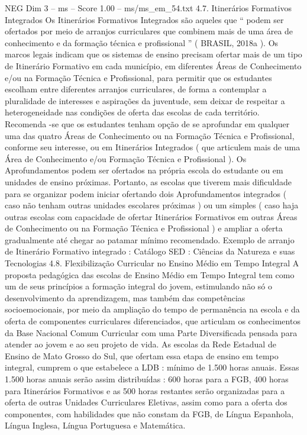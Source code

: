 \begin{textsample}{NEG Dim 3 – ms – Score 1.00 – ms/ms\_em\_54.txt}  \label{ex:f3_neg_093}
4.7.
Itinerários Formativos Integrados Os Itinerários Formativos Integrados são aqueles que “ podem ser ofertados por meio de arranjos curriculares que combinem mais de uma área de conhecimento e da formação técnica e profissional ” ( BRASIL, 2018a ).
Os marcos legais indicam que os sistemas de ensino precisam ofertar mais de um tipo de Itinerário Formativo em cada município, em diferentes Áreas de Conhecimento e/ou na Formação Técnica e Profissional, para permitir que os estudantes escolham entre diferentes arranjos curriculares, de forma a contemplar a pluralidade de interesses e aspirações da juventude, sem deixar de respeitar a heterogeneidade nas condições de oferta das escolas de cada território.
Recomenda -se que os estudantes tenham opção de se aprofundar em qualquer uma das quatro Áreas de Conhecimento ou na Formação Técnica e Profissional, conforme seu interesse, ou em Itinerários Integrados ( que articulem mais de uma Área de Conhecimento e/ou Formação Técnica e Profissional ).
Os Aprofundamentos podem ser ofertados na própria escola do estudante ou em unidades de ensino próximas.
Portanto, as escolas que tiverem mais dificuldade para se organizar podem iniciar ofertando dois Aprofundamentos integrados ( caso não tenham outras unidades escolares próximas ) ou um simples ( caso haja outras escolas com capacidade de ofertar Itinerários Formativos em outras Áreas de Conhecimento ou na Formação Técnica e Profissional ) e ampliar a oferta gradualmente até chegar ao patamar mínimo recomendado.
Exemplo de arranjo de Itinerário Formativo integrado : Catálogo SED : Ciências da Natureza e suas Tecnologias 4.8.
Flexibilização Curricular no Ensino Médio em Tempo Integral A proposta pedagógica das escolas de Ensino Médio em Tempo Integral tem como um de seus princípios a formação integral do jovem, estimulando não só o desenvolvimento da aprendizagem, mas também das competências socioemocionais, por meio da ampliação do tempo de permanência na escola e da oferta de componentes curriculares diferenciados, que articulam os conhecimentos da Base Nacional Comum Curricular com uma Parte Diversificada pensada para atender ao jovem e ao seu projeto de vida.
As escolas da Rede Estadual de Ensino de Mato Grosso do Sul, que ofertam essa etapa de ensino em tempo integral, cumprem o que estabelece a LDB : mínimo de 1.500 horas anuais.
Essas 1.500 horas anuais serão assim distribuídas : 600 horas para a FGB, 400 horas para Itinerários Formativos e as 500 horas restantes serão organizadas para a oferta de outras Unidades Curriculares Eletivas, assim como para a oferta dos componentes, com habilidades que não constam da FGB, de Língua Espanhola, Língua Inglesa, Língua Portuguesa e Matemática.

\end{textsample}
